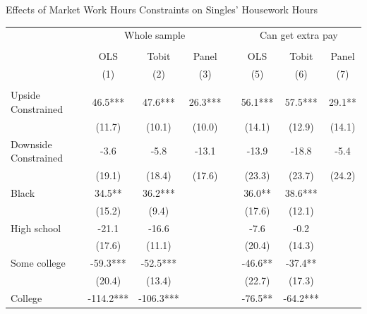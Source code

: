 \begin{center}
\begin{threeparttable}
\caption{Effects of Market Work Hours Constraints on Singles' Housework Hours} \label{Single}
\begin{footnotesize}
\begin{tabular}{lccccccc}
\hline \hline
                     & \multicolumn{3}{c}{Whole sample}  && \multicolumn{3}{c}{Can get extra pay} \\
\cline{2-4} \cline{6-8} \\
                     &OLS            &Tobit          &Panel          &&OLS            &Tobit          &Panel           \\
                     &(1)            &(2)            &(3)            &&(5)            &(6)            &(7)             \\
\hline \\
Upside Constrained   &        46.5***&        47.6***&        26.3***&&        56.1***&        57.5***&        29.1**  \\
                     &      (11.7)   &      (10.1)   &      (10.0)   &&      (14.1)   &      (12.9)   &      (14.1)    \\
Downside Constrained &        -3.6   &        -5.8   &       -13.1   &&       -13.9   &       -18.8   &        -5.4    \\
                     &      (19.1)   &      (18.4)   &      (17.6)   &&      (23.3)   &      (23.7)   &      (24.2)    \\
Black                &        34.5** &        36.2***&               &&        36.0** &        38.6***&                \\
                     &      (15.2)   &       (9.4)   &               &&      (17.6)   &      (12.1)   &                \\
High school          &       -21.1   &       -16.6   &               &&        -7.6   &        -0.2   &                \\
                     &      (17.6)   &      (11.1)   &               &&      (20.4)   &      (14.3)   &                \\
Some college         &       -59.3***&       -52.5***&               &&       -46.6** &       -37.4** &                \\
                     &      (20.4)   &      (13.4)   &               &&      (22.7)   &      (17.3)   &                \\
College              &      -114.2***&      -106.3***&               &&       -76.5** &       -64.2***&                \\

\end{tabular}
\end{footnotesize}
\end{threeparttable}
\end{center}
